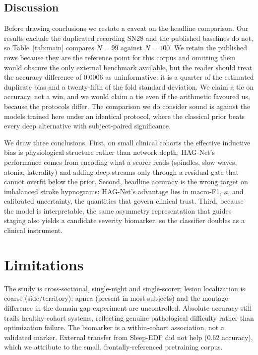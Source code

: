 \documentclass[journal]{IEEEtran}
\begin{document}
\subsection{Discussion}
Before drawing conclusions we restate a caveat on the headline comparison. Our results
exclude the duplicated recording SN28 and the published baselines do not, so
Table~\ref{tab:main} compares $N=99$ against $N=100$. We retain the published rows
because they are the reference point for this corpus and omitting them would obscure
the only external benchmark available, but the reader should treat the accuracy
difference of $0.0006$ as uninformative: it is a quarter of the estimated duplicate
bias and a twenty-fifth of the fold standard deviation. We claim a tie on accuracy,
not a win, and we would claim a tie even if the arithmetic favoured us, because the
protocols differ. The comparison we do consider sound is against the models trained
here under an identical protocol, where the classical prior beats every deep
alternative with subject-paired significance.

We draw three conclusions. First, on small clinical cohorts the effective
inductive bias is physiological structure rather than network depth; HAG-Net's
performance comes from encoding what a scorer reads (spindles, slow waves, atonia,
laterality) and adding deep streams only through a residual gate that cannot overfit
below the prior. Second, headline accuracy is the wrong target on imbalanced stroke
hypnograms; HAG-Net's advantage lies in macro-F1, $\kappa$, and calibrated
uncertainty, the quantities that govern clinical trust. Third, because the model is
interpretable, the same asymmetry representation that guides staging also yields a
candidate severity biomarker, so the classifier doubles as a clinical instrument.

\section{Limitations}
The study is cross-sectional, single-night and single-scorer; lesion localization
is coarse (side/territory); apnea (present in most subjects) and the montage
difference in the domain-gap experiment are uncontrolled. Absolute accuracy still
trails healthy-cohort systems, reflecting genuine pathological difficulty rather
than optimization failure. The biomarker is a within-cohort association, not a
validated marker. External transfer from Sleep-EDF did not help (0.62 accuracy),
which we attribute to the small, frontally-referenced pretraining corpus.
\end{document}
